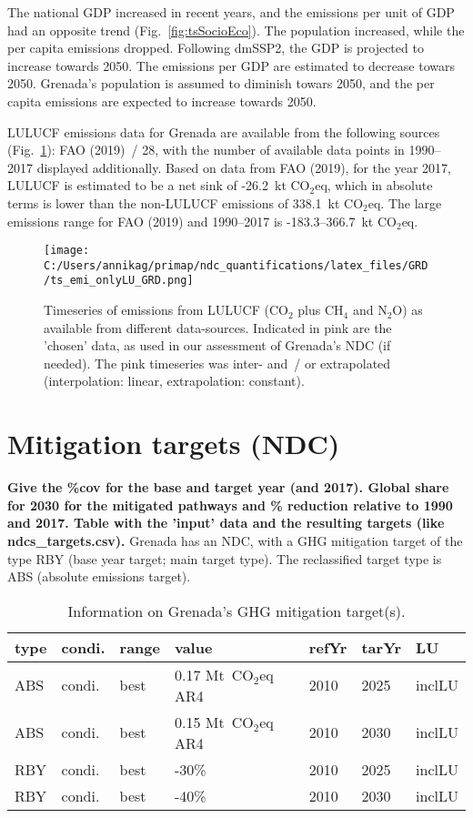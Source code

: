 \documentclass[12pt]{article}
\begin{document}
 The national GDP increased in recent years, and the emissions per unit of GDP had an opposite trend (Fig.~\ref{fig:tsSocioEco}).
 The population increased, while the per capita emissions dropped. 
 Following dmSSP2, the GDP is projected to increase towards 2050. 
 The emissions per GDP are estimated to decrease towars 2050. 
 Grenada's population is assumed to diminish towars 2050, and the per capita emissions are expected to increase towards 2050. 

 LULUCF emissions data for Grenada are available from the following sources (Fig.~\ref{fig:tsLULUCF}): FAO (2019)~/ 28, with the number of available data points in 1990--2017 displayed additionally.
 Based on data from FAO (2019), for the year 2017, LULUCF is estimated to be a net sink of -26.2~kt CO$_2$eq, which in absolute terms is lower than the non-LULUCF emissions of 338.1~kt CO$_2$eq.
 The large emissions range for FAO (2019) and 1990--2017 is -183.3--366.7~kt CO$_2$eq.

 \begin{figure}[H]
 \centering
 \texttt{[image: C:/Users/annikag/primap/ndc\_quantifications/latex\_files/GRD/ts\_emi\_onlyLU\_GRD.png]}
 \caption{Timeseries of emissions from LULUCF (CO$_2$ plus CH$_4$ and N$_2$O) as available from different data-sources. 
 Indicated in pink are the 'chosen' data, as used in our assessment of Grenada's NDC (if needed). 
 The pink timeseries was inter- and~/ or extrapolated (interpolation: linear, extrapolation: constant).}
 \label{fig:tsLULUCF}
 \end{figure}

 \newpage %
 \section{Mitigation targets (NDC)}
 \label{sec:mitiTars}

 \textbf{ 
 Give the \%cov for the base and target year (and 2017). \newline
 Global share for 2030 for the mitigated pathways and \% reduction relative to 1990 and 2017. \newline
 Table with the 'input' data and the resulting targets (like ndcs\_targets.csv). \newline}
 Grenada has an NDC, with a GHG mitigation target of the type RBY (base year target; main target type).
 The reclassified target type is ABS (absolute emissions target).

 \begin{table}[H]
 \centering
 \caption{Information on Grenada's GHG mitigation target(s).}
 \label{tab:mitiTars}
 \begin{tabular}{l l l l l l l }
 \bfseries type & \bfseries condi. & \bfseries range & \bfseries value & \bfseries refYr & \bfseries tarYr & \bfseries LU \tabularnewline \hline \hline
 ABS & condi. & best & 0.17 Mt~CO$_2$eq AR4 & 2010 & 2025 & inclLU \tabularnewline 
 ABS & condi. & best & 0.15 Mt~CO$_2$eq AR4 & 2010 & 2030 & inclLU \tabularnewline \hline
 RBY & condi. & best & -30\% & 2010 & 2025 & inclLU \tabularnewline 
 RBY & condi. & best & -40\% & 2010 & 2030 & inclLU \tabularnewline 
 \end{tabular}
 \end{table}
\end{document}
